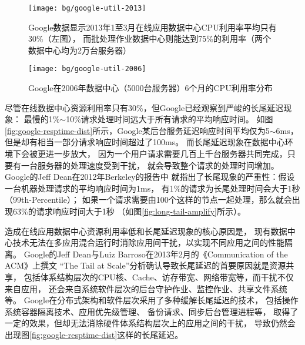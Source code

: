 \begin{figure}
\begin{minipage}{0.57\textwidth}
  \centering
  \texttt{[image: bg/google-util-2013]}
  \caption[Google数据中心CPU利用率分布（2013年）]
    {Google数据显示2013年1至3月在线应用数据中心CPU利用率平均只有30\%（左图），
     而批处理作业数据中心则能达到75\%的利用率（两个数据中心均为2万台服务器）\cite{barroso_datacenter_2013}}
  \label{fig:google-util-2013}
\end{minipage}\hfill
\begin{minipage}{0.39\textwidth}
  \centering
  \texttt{[image: bg/google-util-2006]}
  \caption[Google数据中心CPU利用率分布（2006年）]
    {Google在2006年数据中心（5000台服务器）6个月的CPU利用率分布\cite{barroso_datacenter_2009}}
  \label{fig:google-util-2006}
\end{minipage}
\end{figure}

尽管在线数据中心资源利用率只有30\%，但Google已经观察到严峻的长尾延迟现象：
最慢的1\%$\sim$10\%请求处理时间远大于所有请求的平均响应时间。
如图\ref{fig:google-resptime-dist}所示，Google某后台服务延迟响应时间平均仅为5$\sim$6ms，
但是却有相当一部分请求响应时间超过了100ms\cite{Krushevskaja:2013}。
而长尾延迟现象在数据中心环境下会被更进一步放大，
因为一个用户请求需要几百上千台服务器共同完成，只要有一台服务器的处理速度受到干扰，
就会导致整个请求的处理时间增加。
Google的Jeff Dean在2012年Berkeley的报告\cite{dean_achieving_2012}中
就指出了长尾现象的严重性：假设一台机器处理请求的平均响应时间为1ms，
有1\%的请求为长尾处理时间会大于1秒（99th-Percentile）；
如果一个请求需要由100个这样的节点一起处理，那么就会出现63\%的请求响应时间大于1秒
（如图\ref{fig:long-tail-amplify}所示）。

造成在线应用数据中心资源利用率低和长尾延迟现象的核心原因是，
现有数据中心技术无法在多应用混合运行时消除应用间干扰，以实现不同应用之间的性能隔离。
Google的Jeff Dean与Luiz Barroso在2013年2月的《Communication of the ACM》上撰文
``The Tail at Scale''\cite{dean_tail_2013}分析确认导致长尾延迟的首要原因就是资源共享，
包括体系结构层次的CPU核、Cache、访存带宽、网络带宽等，而干扰不仅来自应用，
还会来自系统软件层次的后台守护作业、监控作业、共享文件系统等。
Google在分布式架构和软件层次采用了多种缓解长尾延迟的技术，
包括操作系统容器隔离技术\cite{cgroup}、应用优先级管理\cite{google_trace}、
备份请求\cite{dean_achieving_2012}、同步后台管理进程\cite{dean_achieving_2012}等，
取得了一定的效果，但却无法消除硬件体系结构层次上的应用之间的干扰，
导致仍然会出现图\ref{fig:google-resptime-dist}这样的长尾延迟。

